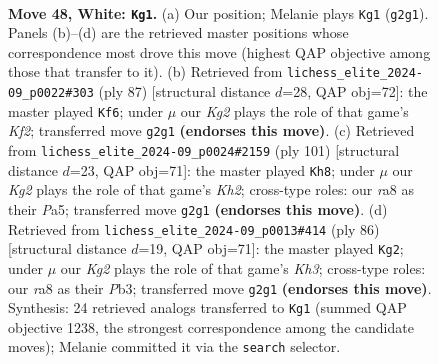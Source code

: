 \documentclass[11pt]{article}
\begin{document}
\clearpage

\begin{figure}[p]\centering
\begin{subfigure}{0.46\textwidth}\centering
\resizebox{\linewidth}{!}{%
\newchessgame
\chessboard[
  setfen={r7/1Q6/4kp2/3p4/5P2/p5P1/P3q1KP/8 w - - 15 48},
  showmover=false,
  pgfstyle=straightmove, color=movearrow, markmove={g2-g1}
]}
\caption{}
\end{subfigure}\hfill
\begin{subfigure}{0.46\textwidth}\centering
\resizebox{\linewidth}{!}{%
\newchessgame
\chessboard[
  setfen={8/3Q1k1p/6p1/8/7P/3p2PK/1P2q3/8 b - - 3 44},
  showmover=false,
  pgfstyle=straightmove, color=movearrow, markmove={f7-f6}
]}
\caption{}
\end{subfigure}
\\[4pt]
\begin{subfigure}{0.46\textwidth}\centering
\resizebox{\linewidth}{!}{%
\newchessgame
\chessboard[
  setfen={8/1p4pk/7p/pP3Q2/q6P/5KP1/8/8 b - - 1 51},
  showmover=false,
  pgfstyle=straightmove, color=movearrow, markmove={h7-h8}
]}
\caption{}
\end{subfigure}\hfill
\begin{subfigure}{0.46\textwidth}\centering
\resizebox{\linewidth}{!}{%
\newchessgame
\chessboard[
  setfen={8/6pk/p1Q4p/5q2/3p4/1P4PK/P6P/8 w - - 1 44},
  showmover=false,
  pgfstyle=straightmove, color=movearrow, markmove={h3-g2}
]}
\caption{}
\end{subfigure}
\caption{\textbf{Move 48, White: \texttt{Kg1}.} (a) Our position; Melanie plays \texttt{Kg1} (\texttt{g2g1}). Panels (b)--(d) are the retrieved master positions whose correspondence most drove this move (highest QAP objective among those that transfer to it). (b) Retrieved from \texttt{lichess\_elite\_2024-09\_p0022\#303} (ply 87) [structural distance $d$=28, QAP obj=72]: the master played \texttt{Kf6}; under $\mu$ our \emph{Kg2} plays the role of that game's \emph{Kf2}; transferred move \texttt{g2g1} \textbf{(endorses this move)}. (c) Retrieved from \texttt{lichess\_elite\_2024-09\_p0024\#2159} (ply 101) [structural distance $d$=23, QAP obj=71]: the master played \texttt{Kh8}; under $\mu$ our \emph{Kg2} plays the role of that game's \emph{Kh2}; cross-type roles: our \emph{r}a8 as their \emph{P}a5; transferred move \texttt{g2g1} \textbf{(endorses this move)}. (d) Retrieved from \texttt{lichess\_elite\_2024-09\_p0013\#414} (ply 86) [structural distance $d$=19, QAP obj=71]: the master played \texttt{Kg2}; under $\mu$ our \emph{Kg2} plays the role of that game's \emph{Kh3}; cross-type roles: our \emph{r}a8 as their \emph{P}b3; transferred move \texttt{g2g1} \textbf{(endorses this move)}. Synthesis: 24 retrieved analogs transferred to \texttt{Kg1} (summed QAP objective 1238, the strongest correspondence among the candidate moves); Melanie committed it via the \texttt{search} selector.}
\label{fig:thought-m94}
\end{figure}
\end{document}
